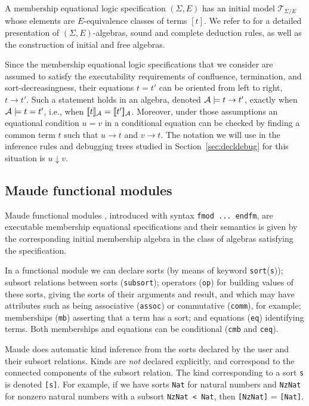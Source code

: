 A membership equational logic specification $(\Sigma,E)$ has an initial model 
$\mathcal{T}_{\Sigma/E}$ whose elements
are $E$-equivalence classes of terms $[t]$.
We refer to \cite{BouhoulaJouannaudMeseguer00,Meseguer97} for a detailed presentation of
$(\Sigma,E)$-algebras,
sound and complete deduction rules, as well as the construction of
initial and free algebras.

Since the membership equational logic specifications that we consider are assumed
to satisfy the executability requirements of confluence, termination, and 
sort-decreasingness, their equations $t=t'$ can be oriented from left to right,
$t \rightarrow t'$. Such a statement holds in an algebra, denoted 
$\mathcal{A} \models t \rightarrow t'$, exactly when $\mathcal{A} \models t = t'$, i.e., when
$[\![t]\!]_{\mathcal{A}} = [\![t']\!]_{\mathcal{A}}$. Moreover, under those assumptions an equational condition $u = v$
in a conditional equation can be checked by finding a common term $t$ such
that $u \rightarrow t$ and $v \rightarrow t$. The notation we will use in 
the inference rules and debugging trees studied in Section~\ref{sec:decldebug} for this
situation is $u \downarrow v$.

\subsection{Maude functional modules} \label{maudefmod}

Maude functional modules \cite[Chapter 4]{maude-book}, introduced 
with syntax \texttt{fmod ...\ endfm}, are executable membership
equational specifications and their semantics is given by the corresponding
initial membership algebra in the class of algebras satisfying the specification.

In a functional module we can declare sorts (by means of keyword
\texttt{sort}(\texttt{s})); subsort relations between sorts
(\texttt{subsort}); operators (\texttt{op}) for building values of these
sorts, giving the sorts of their arguments and result, and which may have
attributes such as being associative (\texttt{assoc}) or commutative
(\texttt{comm}), for example; memberships (\texttt{mb}) asserting that a term
has a sort; and equations (\texttt{eq}) identifying terms.  
Both memberships and equations can be conditional (\texttt{cmb} and \texttt{ceq}).

Maude does automatic kind inference from the sorts declared by the user and
their subsort relations.  Kinds are \emph{not} declared explicitly, and
correspond to the connected components of the subsort relation.
The kind corresponding to a sort \texttt{s} is denoted \texttt{[s]}.
For example, if we have sorts \texttt{Nat} for natural numbers and \texttt{NzNat} 
for nonzero natural numbers with a subsort \texttt{NzNat < Nat}, then 
\texttt{[NzNat]} = \texttt{[Nat]}.

